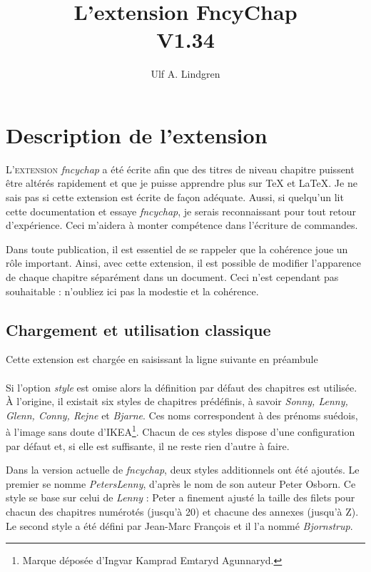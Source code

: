 \documentclass{report}
\title{L'extension FncyChap\\V1.34}
\author{Ulf A. Lindgren}
\date{}
\newcommand{\sk}{\vspace{0.2 cm}}
\newcommand{\A}[1]{{$\backslash${\tt #1}}}
\newcommand{\nsp}{\mbox{\hspace{-1 cm}}}
\begin{document}
  \maketitle
  \tableofcontents
  \chapter{Description de l'extension}
    \lettrine[findent=0.2em,nindent=0em,realheight=true]{L'}{extension} 
    \textsl{fncychap} a été écrite afin que des titres de niveau chapitre
    puissent être altérés rapidement et que je puisse apprendre plus sur
    \TeX{} et \LaTeX{}. Je ne sais pas si cette extension est écrite de façon
    adéquate. Aussi, si quelqu'un lit cette documentation et essaye 
    \textsl{fncychap}, je serais reconnaissant pour tout retour d'expérience. 
    Ceci m'aidera à monter compétence dans l'écriture de commandes. 
 
    Dans toute publication, il est essentiel de se rappeler que la cohérence
    joue un rôle important. Ainsi, avec cette extension, il est possible de
    modifier l'apparence de chaque chapitre séparément dans un document. Ceci
    n'est cependant pas souhaitable : n'oubliez ici pas la modestie et la 
    cohérence.

    \section{Chargement et utilisation classique}
    Cette extension est chargée en saisissant la ligne suivante en 
    préambule\sk\\    
    \nsp\fbox{\A{usepackage}[{\em style}]\{{\em fncychap}\}}\sk\\    
    Si l'option \emph{style} est omise alors la définition par défaut des 
    chapitres est utilisée. À l'origine, il existait six styles de chapitres
    prédéfinis, à savoir \emph{Sonny, Lenny, Glenn, Conny, Rejne} et 
    \emph{Bjarne}. Ces noms correspondent à des prénoms suédois, à l'image sans
    doute d'IKEA\footnote{Marque déposée d'Ingvar Kamprad Emtaryd Agunnaryd.}. 
    Chacun de ces styles dispose d'une configuration par défaut et, si elle
    est suffisante, il ne reste rien d'autre à faire.

    Dans la version actuelle de \textsl{fncychap}, deux styles additionnels
    ont été ajoutés. Le premier se nomme \emph{PetersLenny}, d'après le nom de
    son auteur Peter Osborn. Ce style se base sur celui de \emph{Lenny} : Peter
    a finement ajusté la taille des filets pour chacun des chapitres numérotés
    (jusqu'à 20) et chacune des annexes (jusqu'à Z). Le second style a été 
    défini par Jean-Marc François et il l'a nommé \textsl{Bjornstrup}.
\end{document}
